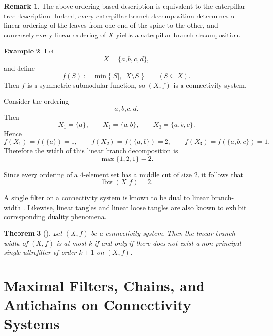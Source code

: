 \documentclass[10pt]{book}
\newtheorem{theorem}{Theorem}[section]
\theoremstyle{definition}
\newtheorem{remark}[theorem]{Remark}
\newtheorem{example}[theorem]{Example}
\begin{document}
\begin{remark}
The above ordering-based description is equivalent to the caterpillar-tree description.
Indeed, every caterpillar branch decomposition determines a linear ordering of the leaves from one end of the spine to the other, and conversely every linear ordering of \(X\) yields a caterpillar branch decomposition.
\end{remark}

\begin{example}
\label{ex:linear-branch-width}
Let
\[
X=\{a,b,c,d\},
\]
and define
\[
f(S):=\min\{|S|,\ |X\setminus S|\}
\qquad (S\subseteq X).
\]
Then \(f\) is a symmetric submodular function, so \((X,f)\) is a connectivity system.

Consider the ordering
\[
a,b,c,d.
\]
Then
\[
X_1=\{a\},\qquad
X_2=\{a,b\},\qquad
X_3=\{a,b,c\}.
\]
Hence
\[
f(X_1)=f(\{a\})=1,\qquad
f(X_2)=f(\{a,b\})=2,\qquad
f(X_3)=f(\{a,b,c\})=1.
\]
Therefore the width of this linear branch decomposition is
\[
\max\{1,2,1\}=2.
\]

Since every ordering of a \(4\)-element set has a middle cut of size \(2\), it follows that
\[
\operatorname{lbw}(X,f)=2.
\]
\end{example}

A single filter on a connectivity system is known to be dual to linear branch-width \cite{85}.  
Likewise, linear tangles \cite{fujita2018equivalence} and linear loose tangles \cite{3} are also known to exhibit corresponding duality phenomena.

\begin{theorem}[\cite{4}]
\label{thm:linear-branch-width}
Let \((X,f)\) be a connectivity system. Then the linear branch-width of \((X,f)\) is at most \(k\) if and only if there does not exist a non-principal single ultrafilter of order \(k+1\) on \((X,f)\).
\end{theorem}


\newpage
\chapter{Maximal Filters, Chains, and Antichains on Connectivity Systems}
\end{document}
